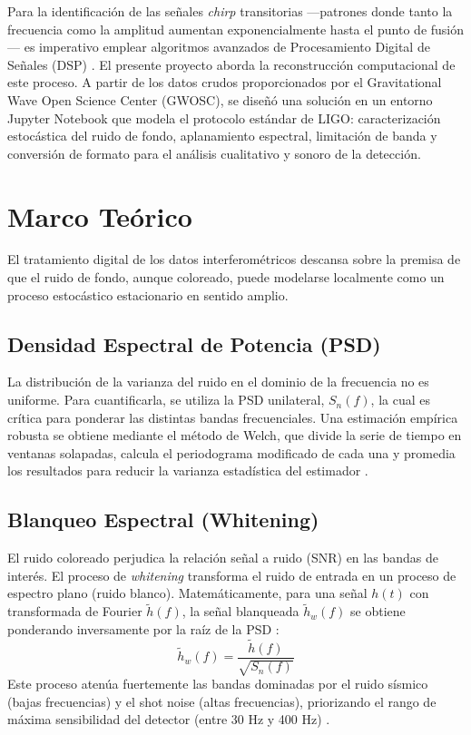 \documentclass[conference]{IEEEtran}
\begin{document}
	Para la identificación de las señales \textit{chirp} transitorias —patrones donde tanto la frecuencia como la amplitud aumentan exponencialmente hasta el punto de fusión— es imperativo emplear algoritmos avanzados de Procesamiento Digital de Señales (DSP) \cite{raman2017signal}. El presente proyecto aborda la reconstrucción computacional de este proceso. A partir de los datos crudos proporcionados por el Gravitational Wave Open Science Center (GWOSC), se diseñó una solución en un entorno Jupyter Notebook que modela el protocolo estándar de LIGO: caracterización estocástica del ruido de fondo, aplanamiento espectral, limitación de banda y conversión de formato para el análisis cualitativo y sonoro de la detección.
	
	\section{Marco Teórico}
	El tratamiento digital de los datos interferométricos descansa sobre la premisa de que el ruido de fondo, aunque coloreado, puede modelarse localmente como un proceso estocástico estacionario en sentido amplio.
	
	\subsection{Densidad Espectral de Potencia (PSD)}
	La distribución de la varianza del ruido en el dominio de la frecuencia no es uniforme. Para cuantificarla, se utiliza la PSD unilateral, $S_n(f)$, la cual es crítica para ponderar las distintas bandas frecuenciales. Una estimación empírica robusta se obtiene mediante el método de Welch, que divide la serie de tiempo en ventanas solapadas, calcula el periodograma modificado de cada una y promedia los resultados para reducir la varianza estadística del estimador \cite{abbott2020guide}.
	
	\subsection{Blanqueo Espectral (Whitening)}
	El ruido coloreado perjudica la relación señal a ruido (SNR) en las bandas de interés. El proceso de \textit{whitening} transforma el ruido de entrada en un proceso de espectro plano (ruido blanco). Matemáticamente, para una señal $h(t)$ con transformada de Fourier $\tilde{h}(f)$, la señal blanqueada $\tilde{h}_w(f)$ se obtiene ponderando inversamente por la raíz de la PSD \cite{whiteningprocedure}:
	\begin{equation}
		\tilde{h}_w(f) = \frac{\tilde{h}(f)}{\sqrt{S_n(f)}}
	\end{equation}
	Este proceso atenúa fuertemente las bandas dominadas por el ruido sísmico (bajas frecuencias) y el shot noise (altas frecuencias), priorizando el rango de máxima sensibilidad del detector (entre 30 Hz y 400 Hz) \cite{belahcene2019searching}.
	
\end{document}
